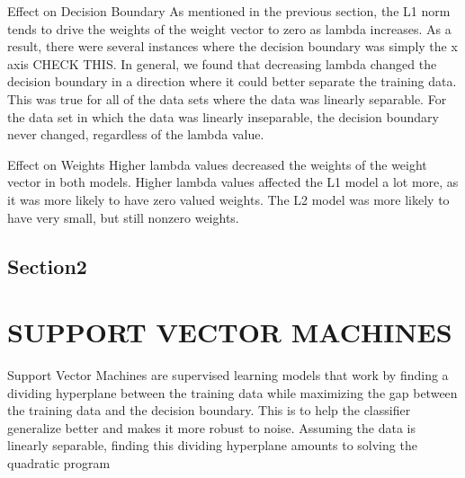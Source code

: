 \documentclass[a4paper,twoside]{article}
\begin{document}
Effect on Decision Boundary 
As mentioned in the previous section, the L1 norm tends to drive the weights of the weight vector to zero as lambda increases. As a result, there were several instances where the decision boundary was simply the x axis CHECK THIS. In general, we found that decreasing lambda changed the decision boundary in a direction where it could better separate the training data. This was true for all of the data sets where the data was linearly separable. For the data set in which the data was linearly inseparable, the decision boundary never changed, regardless of the lambda value. 

Effect on Weights
Higher lambda values decreased the weights of the weight vector in both models. Higher lambda values affected the L1 model a lot more, as it was more likely to have zero valued weights. The L2 model was more likely to have very small, but still nonzero weights. 


\subsection{Section2}




\section{\uppercase{Support Vector Machines}}

Support Vector Machines are supervised learning models that work by finding a dividing hyperplane between the training data while maximizing the gap between the training data and the decision boundary. This is to help the classifier generalize better and makes it more robust to noise. Assuming the data is linearly separable, finding this dividing hyperplane amounts to solving the quadratic program


\end{document}
